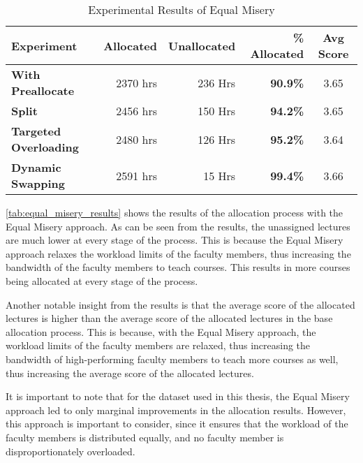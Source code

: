 \begin{table}[H]
  \centering
  \begin{tabular}{|l|r|r|r|c|}
    \hline
    \textbf{Experiment}           & \textbf{Allocated} & \textbf{Unallocated} & \textbf{\% Allocated} & \textbf{Avg Score} \\ \hline
    \textbf{With Preallocate}     & 2370 hrs           & 236 Hrs              & \textbf{90.9\%}       & 3.65               \\ \hline
    \textbf{Split}                & 2456 hrs           & 150 Hrs              & \textbf{94.2\%}       & 3.65               \\ \hline
    \textbf{Targeted Overloading} & 2480 hrs           & 126 Hrs              & \textbf{95.2\%}       & 3.64               \\ \hline
    \textbf{Dynamic Swapping}     & 2591 hrs           & 15 Hrs               & \textbf{99.4\%}       & 3.66               \\ \hline
  \end{tabular}
  \caption{Experimental Results of Equal Misery}
  \label{tab:equal_misery_results}
\end{table}

\autoref{tab:equal_misery_results} shows the results of the allocation process with the Equal Misery approach. As can be seen from the results, the unassigned lectures are much lower at every stage of the process. This is because the Equal Misery approach relaxes the workload limits of the faculty members, thus increasing the bandwidth of the faculty members to teach courses. This results in more courses being allocated at every stage of the process.

Another notable insight from the results is that the average score of the allocated lectures is higher than the average score of the allocated lectures in the base allocation process. This is because, with the Equal Misery approach, the workload limits of the faculty members are relaxed, thus increasing the bandwidth of high-performing faculty members to teach more courses as well, thus increasing the average score of the allocated lectures.

It is important to note that for the dataset used in this thesis, the Equal Misery approach led to only marginal improvements in the allocation results. However, this approach is important to consider, since it ensures that the workload of the faculty members is distributed equally, and no faculty member is disproportionately overloaded.

